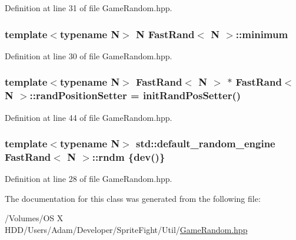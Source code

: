 Definition at line 31 of file Game\-Random.\-hpp.

\hypertarget{class_fast_rand_a7041d4ec9e4da25457fe86bada8bca49}{
\subsubsection[{minimum}]{\setlength{\rightskip}{0pt plus 5cm}template$<$typename N$>$ N {\bf Fast\-Rand}$<$ N $>$\-::minimum\hspace{0.3cm}{\ttfamily [protected]}}}\label{class_fast_rand_a7041d4ec9e4da25457fe86bada8bca49}


Definition at line 30 of file Game\-Random.\-hpp.

\hypertarget{class_fast_rand_aba6b711ca110b6e3ffa5aef1048cfa9b}{
\subsubsection[{rand\-Position\-Setter}]{\setlength{\rightskip}{0pt plus 5cm}template$<$typename N$>$ {\bf Fast\-Rand}$<$ N $>$ $\ast$ {\bf Fast\-Rand}$<$ N $>$\-::rand\-Position\-Setter = {\bf init\-Rand\-Pos\-Setter}()\hspace{0.3cm}{\ttfamily [static]}}}\label{class_fast_rand_aba6b711ca110b6e3ffa5aef1048cfa9b}


Definition at line 44 of file Game\-Random.\-hpp.

\hypertarget{class_fast_rand_a8f87664883d9d0567615b169e99bcec5}{
\subsubsection[{rndm}]{\setlength{\rightskip}{0pt plus 5cm}template$<$typename N$>$ std\-::default\-\_\-random\-\_\-engine {\bf Fast\-Rand}$<$ N $>$\-::rndm \{{\bf dev}()\}\hspace{0.3cm}{\ttfamily [protected]}}}\label{class_fast_rand_a8f87664883d9d0567615b169e99bcec5}


Definition at line 28 of file Game\-Random.\-hpp.



The documentation for this class was generated from the following file\-:\begin{DoxyCompactItemize}
\item 
/\-Volumes/\-O\-S X H\-D\-D/\-Users/\-Adam/\-Developer/\-Sprite\-Fight/\-Util/\hyperlink{_game_random_8hpp}{Game\-Random.\-hpp}\end{DoxyCompactItemize}
